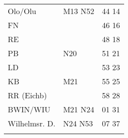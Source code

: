\begin{tabular}{!{\color{schiefergrau}\vrule width 3pt}*{3}{l!{\color{schiefergrau}\vrule width 3pt}}}
Olo/Olu      & \nuneun{} \mtram{} M13 \nbus{} N52                             & 44 14 \\
FN           &                                                                & 46 16 \\
RE           &                                                                & 48 18 \\
PB           & \nbus{} N20                                                    & 51 21 \\
LD           &                                                                & 53 23 \\
KB           & \mbus{} M21                                                    & 55 25 \\
RR (Eichb)   &                                                                & 58 28 \\
BWIN/WIU     & \mbus{} M21 \nbus{} N24                                        & 01 31 \\
Wilhelmsr. D.& \nbus{} N24 N53                                                & 07 37 \\
\myhline
\end{tabular}
